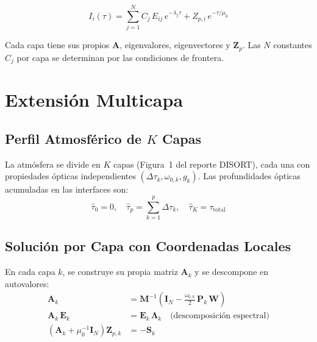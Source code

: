 \documentclass[a4paper,11pt]{article}
\begin{document}
\begin{equation}\label{eq:general_sol}
    \boxed{I_i(\tau) = \sum_{j=1}^{N}C_j\,E_{ij}\,e^{-\lambda_j\tau}
    + Z_{p,i}\,e^{-\tau/\mu_0}}
\end{equation}

Cada capa tiene sus propios $\mathbf{A}$, eigenvalores, eigenvectores y
$\mathbf{Z}_p$.  Las $N$ constantes $C_j$ por capa se determinan por las
condiciones de frontera.


\section{Extensi\'on Multicapa}

\subsection{Perfil Atmosf\'erico de $K$ Capas}

La atm\'osfera se divide en $K$ capas (Figura~1 del reporte DISORT), cada una
con propiedades \'opticas independientes $(\Delta\tau_k, \omega_{0,k}, g_k)$.
Las profundidades \'opticas acumuladas en las interfaces son:
\begin{equation}
    \hat{\tau}_0 = 0,\quad
    \hat{\tau}_p = \sum_{k=1}^{p}\Delta\tau_k,\quad
    \hat{\tau}_K = \tau_{\text{total}}
\end{equation}

\subsection{Soluci\'on por Capa con Coordenadas Locales}

En cada capa $k$, se construye su propia matriz $\mathbf{A}_k$ y se
descompone en autovalores:
\begin{align}
    \mathbf{A}_k &= \mathbf{M}^{-1}\!\left(\mathbf{I}_N
    - \tfrac{\omega_{0,k}}{2}\,\mathbf{P}_k\,\mathbf{W}\right)\\
    \mathbf{A}_k\,\mathbf{E}_k &= \mathbf{E}_k\,\bm{\Lambda}_k
    \quad\text{(descomposici\'on espectral)}\\
    \left(\mathbf{A}_k + \mu_0^{-1}\mathbf{I}_N\right)\mathbf{Z}_{p,k} &= -\mathbf{S}_k
\end{align}
\end{document}
